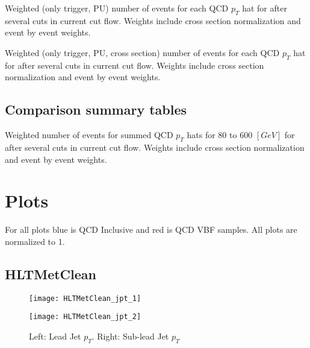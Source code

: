 \documentclass[a4paper,10pt]{article}
\begin{document}
\begin{table}[!h]
\centering
\resizebox{\linewidth}{!}{}
\caption{Weighted (only trigger, PU) number of events for each QCD $p_T$ hat for after several cuts in current cut flow. Weights include cross section normalization and event by event weights.}
\end{table}

\begin{table}[!h]
\centering
\resizebox{\linewidth}{!}{}
\caption{Weighted (only trigger, PU, cross section) number of events for each QCD $p_T$ hat for after several cuts in current cut flow. Weights include cross section normalization and event by event weights.}
\end{table}

\subsection{Comparison summary tables}

\begin{table}[!h]
\centering
\resizebox{\linewidth}{!}{}
\caption{Weighted number of events for summed QCD $p_T$ hats for 80 to 600 $[GeV]$ for after several cuts in current cut flow. Weights include cross section normalization and event by event weights.}
\end{table}

\begin{table}[!h]
\centering

\caption{}
\end{table}


\section{Plots}

For all plots blue is QCD Inclusive and red is QCD VBF samples. All plots are normalized to 1.

\clearpage
\subsection{HLTMetClean}

\begin{figure}[!h]
\centering
\begin{minipage}[!h]{0.4\linewidth}
\centering
\texttt{[image: HLTMetClean\_jpt\_1]}
\end{minipage}%
\begin{minipage}[!h]{0.4\linewidth}
  \texttt{[image: HLTMetClean\_jpt\_2]}
\end{minipage}
\caption{Left: Lead Jet $p_T$. Right: Sub-lead Jet $p_T$}
\end{figure}
\end{document}
